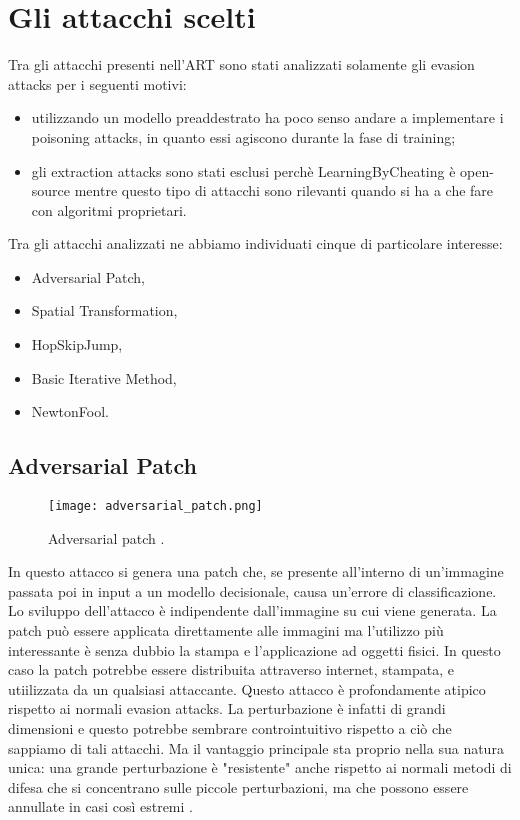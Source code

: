 \section{Gli attacchi scelti}
Tra gli attacchi presenti nell'ART sono stati analizzati solamente gli evasion attacks per i seguenti motivi:\begin{itemize}
    \item utilizzando un modello preaddestrato ha poco senso andare a implementare i poisoning attacks, in quanto essi agiscono durante la fase di training;
    \item gli extraction attacks sono stati esclusi perchè LearningByCheating è open-source mentre questo tipo di attacchi sono rilevanti quando si ha a che fare
    con algoritmi proprietari.
\end{itemize}
Tra gli attacchi analizzati ne abbiamo individuati cinque di particolare interesse:\begin{itemize}
    \item Adversarial Patch,
    \item Spatial Transformation,
    \item HopSkipJump,
    \item Basic Iterative Method,
    \item NewtonFool.
\end{itemize}
\subsection{Adversarial Patch} 
\begin{figure}[h]
    \texttt{[image: adversarial\_patch.png]}
    \caption{Adversarial patch \cite{patch}.}
    \label{fig:patch}
\end{figure}
In questo attacco si genera una patch che, se presente all'interno di un'immagine passata poi in input a un modello decisionale, causa un'errore di classificazione. Lo sviluppo dell'attacco è 
indipendente dall'immagine su cui viene generata. La patch può essere applicata direttamente alle immagini ma l'utilizzo più interessante è senza dubbio la stampa e l'applicazione
ad oggetti fisici. In questo caso la patch potrebbe essere distribuita attraverso internet, stampata, e utiilizzata da un qualsiasi attaccante. Questo attacco è profondamente atipico rispetto
ai normali evasion attacks. La perturbazione è infatti di grandi dimensioni e questo potrebbe sembrare controintuitivo rispetto a ciò che sappiamo di tali attacchi. Ma il vantaggio principale
sta proprio nella sua natura unica: una grande perturbazione è "resistente" anche rispetto ai normali metodi di difesa che si concentrano sulle piccole perturbazioni, ma che possono essere annullate in 
casi così estremi \cite{patch}. 

